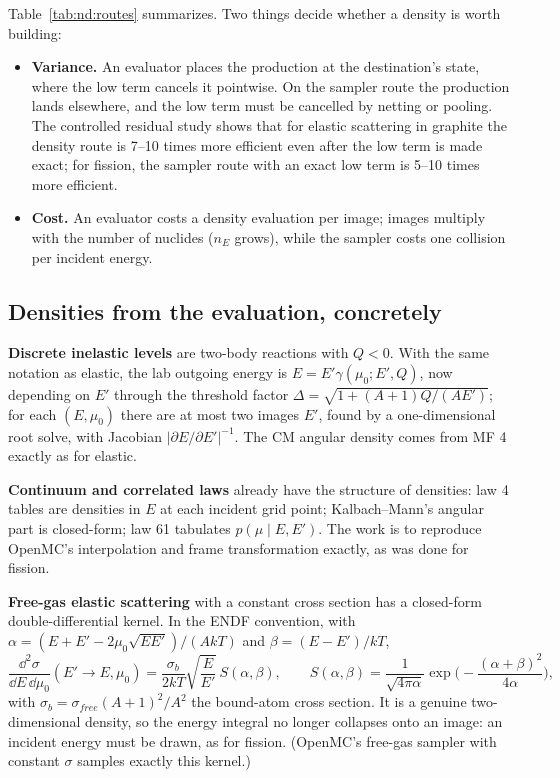 Table~\ref{tab:nd:routes} summarizes. Two things decide whether a density is worth building:
\begin{itemize}
\item \textbf{Variance.} An evaluator places the production at the destination's state, where the
  low term cancels it pointwise. On the sampler route the production lands elsewhere, and the low
  term must be cancelled by netting or pooling. The controlled residual study shows that for elastic
  scattering in graphite the density route is 7--10 times more efficient even after the low term is
  made exact; for fission, the sampler route with an exact low term is 5--10 times more efficient.
\item \textbf{Cost.} An evaluator costs a density evaluation per image; images multiply with the
  number of nuclides ($n_E$ grows), while the sampler costs one collision per incident energy.
\end{itemize}

\subsection{Densities from the evaluation, concretely}

\textbf{Discrete inelastic levels} are two-body reactions with $Q<0$. With the same notation as
elastic, the lab outgoing energy is $E=E'\gamma(\mu_0;E',Q)$, now depending on $E'$ through the
threshold factor $\Delta=\sqrt{1+(A+1)Q/(AE')}$; for each $(E,\mu_0)$ there are at most two images
$E'$, found by a one-dimensional root solve, with Jacobian $|\partial E/\partial E'|^{-1}$. The CM
angular density comes from MF 4 exactly as for elastic.

\textbf{Continuum and correlated laws} already have the structure of densities: law 4 tables are
densities in $E$ at each incident grid point; Kalbach--Mann's angular part is closed-form; law 61
tabulates $p(\mu\mid E,E')$. The work is to reproduce OpenMC's interpolation and frame transformation
exactly, as was done for fission.

\textbf{Free-gas elastic scattering} with a constant cross section has a closed-form
double-differential kernel. In the ENDF convention, with $\alpha=(E+E'-2\mu_0\sqrt{EE'})/(AkT)$ and
$\beta=(E-E')/kT$,
\begin{equation}
\frac{\dd^2\sigma}{\dd E\,\dd\mu_0}(E'\to E,\mu_0)=\frac{\sigma_b}{2kT}\sqrt{\frac{E}{E'}}\,S(\alpha,\beta),
\qquad S(\alpha,\beta)=\frac{1}{\sqrt{4\pi\alpha}}\exp\!\Big(-\frac{(\alpha+\beta)^2}{4\alpha}\Big),
\end{equation}
with $\sigma_b=\sigma_{free}(A+1)^2/A^2$ the bound-atom cross section. It is a genuine
two-dimensional density, so the energy integral no longer collapses onto an image: an incident energy
must be drawn, as for fission. (OpenMC's free-gas sampler with constant $\sigma$ samples exactly this
kernel.)

